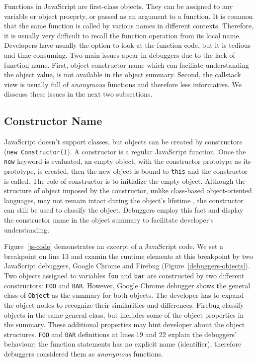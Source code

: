 \documentclass[10pt, preprint]{sigplanconf}
\begin{document}
Functions in JavaScript are first-class objects. They can be assigned to any variable or object proeprty, or passed as an argument to a function. It is common that the same function is called by various names in different contexts. Therefore, it is usually very difficult to recall the function operation from its local name. Developers have usually the option to look at the function code, but it is tedious and time-consuming. Two main issues apear in debuggers due to the lack of function name. First, object constructor name which can faciliate understanding the object value, is not available in the object summary. Second, the callstack view is usually full of \textit{anonymous} functions and therefore less informative. We disscuss these issues in the next two subsections.
 
\subsection{Constructor Name}
JavaScript doesn't support classes, but objects can be created by constructors ({\small\texttt{new Constructor()}}). A constructor is a regular JavaScript function. Once the {\small\texttt{new}} keyword is evaluated, an empty object, with the constructor prototype as its prototype, is created, then the new object is bound to {\small\texttt{this}} and the constructor is called. The role of constructor is to initialize the empty object. Although the structure of object imposed by the constructor, unlike class-based object-oriented languages, may not remain intact during the object's lifetime \cite{Richards}, the constructor can still be used to classify the object. 
Debuggers employ this fact and display the constructor name in the object summary to facilitate developer's understanding. 

Figure~\ref{js-code} demonstrates an excerpt of a JavaScript code. We set a breakpoint on line 13 and examin the runtime elements at this breakpoint by two JavaScript debuggers, Google Chrome and Firebug (Figure~\ref{debuggers-objects}). Two objects assigned to variables {\small\texttt{foo}} and {\small\texttt{bar}} are constructed by two different constructors: {\small\texttt{FOO}} and {\small\texttt{BAR}}. However, Google Chrome debugger shows the general class of {\small\texttt{Object}} as the summary for both objects. The developer has to expand the object nodes to recognize their similarities and differences. Firebug classify objects in the same general class, but includes some of the object properties in the summary. These additional properties may hint developer about the object structures. {\small\texttt{FOO}} and {\small\texttt{BAR}} definitions at lines 19 and 22 explain the debuggers' behaviour; the function statements has no explicit name (identifier), therefore debuggers considered them as \textit{anonymous} functions.
\end{document}
